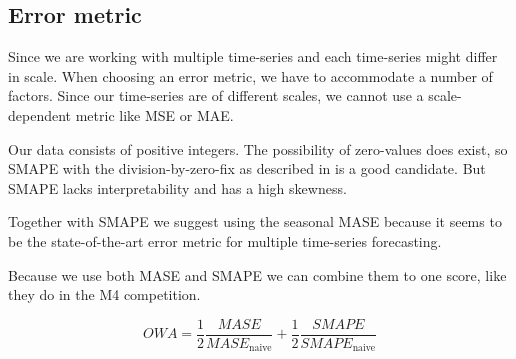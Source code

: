 \subsection{Error metric}


Since we are working with multiple time-series and each time-series might differ in scale.
When choosing an error metric, we have to accommodate a number of factors.
Since our time-series are of different scales, we cannot use a scale-dependent metric
like MSE or MAE.

Our data consists of positive integers. The possibility of zero-values does exist,
so SMAPE with the division-by-zero-fix as described in  is a good candidate.
But SMAPE lacks interpretability and has a high skewness.

Together with SMAPE we suggest using the seasonal MASE because it seems to be the
state-of-the-art error metric for multiple time-series forecasting.

Because we use both MASE and SMAPE we can combine them to one score, like
they do in the M4 competition.

\begin{equation}
  \label{eq:OWA}
  OWA = \frac{1}{2} \frac{MASE}{MASE_{\text{naive}}} + \frac{1}{2} \frac{SMAPE}{SMAPE_{\text{naive}}}
\end{equation}
